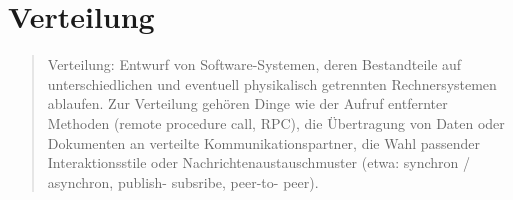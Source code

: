 \section{Verteilung}

\begin{quote}
	Verteilung: Entwurf von Software-Systemen, deren Bestandteile auf unterschiedlichen und eventuell physikalisch getrennten Rechnersystemen ablaufen.
	Zur Verteilung gehören Dinge wie der Aufruf entfernter Methoden (remote procedure call, RPC), die Übertragung von Daten oder Dokumenten an verteilte Kommunikationspartner, die Wahl passender Interaktionsstile oder Nachrichtenaustauschmuster (etwa: synchron / asynchron, publish- subsribe, peer-to- peer).
\end{quote}
